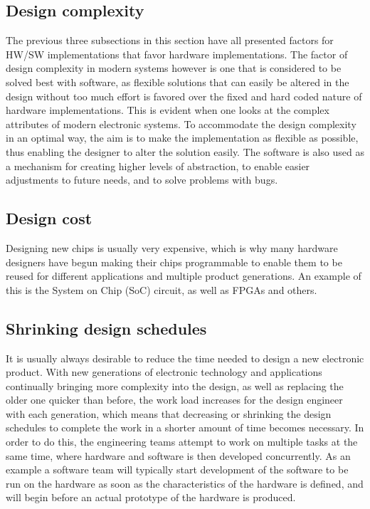 \subsection{Design complexity}
The previous three subsections in this section have all presented factors for HW/SW implementations that favor hardware implementations. The factor of design complexity in modern systems however is one that is considered to be solved best with software, as flexible solutions that can easily be altered in the design without too much effort is favored over the fixed and hard coded nature of hardware implementations. This is evident when one looks at the complex attributes of modern electronic systems. To accommodate the design complexity in an optimal way, the aim is to make the implementation as flexible as possible, thus enabling the designer to alter the solution easily. The software is also used as a mechanism for creating higher levels of abstraction, to enable easier adjustments to future needs, and to solve problems with bugs. 
\\
\noindent
\subsection{Design cost}
Designing new chips is usually very expensive, which is why many hardware designers have begun making their chips programmable to enable them to be reused for different applications and multiple product generations. An example of this is the System on Chip (SoC) circuit, as well as FPGAs and others. 
\\
\noindent
\subsection{Shrinking design schedules}
It is usually always desirable to reduce the time needed to design a new electronic product. With new generations of electronic technology and applications continually bringing more complexity into the design, as well as replacing the older one quicker than before, the work load increases for the design engineer with each generation, which means that decreasing or shrinking the design schedules to complete the work in a shorter amount of time becomes necessary. In order to do this, the engineering teams attempt to work on multiple tasks at the same time, where hardware and software is then developed concurrently. As an example a software team will typically start development of the software to be run on the hardware as soon as the characteristics of the hardware is defined, and will begin before an actual prototype of the hardware is produced. 
\\
\noindent
